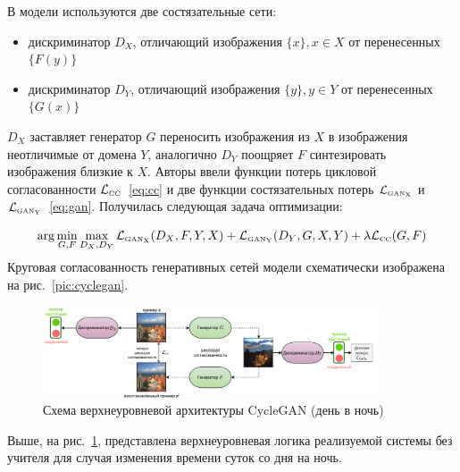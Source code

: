 \documentclass[11pt,a4paper]{extarticle}
\begin{document}
			\noindent 
			В модели используются две состязательные сети:
			\begin{itemize}
				\setlength\parskip{0pt}
				\vspace{-0.5em}
				\item дискриминатор \(D_X\), отличающий изображения \(\{x\}, x \in X\) от перенесенных \(\{F(y)\}\)
				\item дискриминатор \(D_Y\), отличающий изображения \(\{y\}, y \in Y\) от перенесенных \(\{G(x)\}\)
			\end{itemize}
			\(D_X\) заставляет генератор \(G\) переносить изображения из \(X\) в изображения неотличимые от домена \(Y\), аналогично \(D_Y\) поощряет \(F\) синтезировать изображения близкие к \(X\).
			Авторы ввели функции потерь цикловой согласованности \(\mathcal{L}_{\text{\tiny CC}}\)~\eqref{eq:cc} и две функции состязательных потерь \(\mathcal{L}_{\text{\tiny GAN}_{\text{\tiny X}}}\) и \(\mathcal{L}_{\text{\tiny GAN}_{\text{\tiny Y}}}\)~\eqref{eq:gan}.
			Получилась следующая задача оптимизации:

			\begin{equation}\label{eq:cyclegan}
				\arg\min_{G, F}\max_{D_X, D_Y}\mathcal{L}_{\text{\tiny GAN}_{\text{\tiny X}}}(D_X,F,Y,X) + \mathcal{L}_{\text{\tiny GAN}_{\text{\tiny Y}}}(D_Y,G,X,Y) + \lambda\mathcal{L}_{\text{\tiny CC}}(G,F)
			\end{equation}
			Круговая согласованность генеративных сетей модели схематически изображена на рис.~\ref{pic:cyclegan}.

			\begin{figure}[ht]
				\centering
				\includegraphics[width=0.9\textwidth]{img/cyclegan_model}
				\caption[Схема верхнеуровневой архитектуры CycleGAN (день в ночь)]{Схема верхнеуровневой архитектуры CycleGAN (день в ночь)\footnotemark}
				\label{pic:cyclegan_model}
			\end{figure}  
			\noindent
			Выше, на рис.~\ref{pic:cyclegan_model}, представлена верхнеуровневая логика реализуемой системы без учителя для случая изменения времени суток со дня на ночь. 
			
\end{document}
